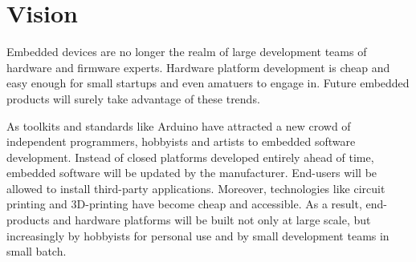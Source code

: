 \section{Vision}

Embedded devices are no longer the realm of large development teams of hardware
and firmware experts. Hardware platform development is cheap and easy enough for
small startups and even amatuers to engage in. Future embedded products will
surely take advantage of these trends. 

As toolkits and standards like Arduino have attracted a new crowd of independent
programmers, hobbyists and artists to embedded software development. Instead of
closed platforms developed entirely ahead of time, embedded software will be
updated by the manufacturer. End-users will be allowed to install third-party
applications. Moreover, technologies like circuit printing and 3D-printing have
become cheap and accessible. As a result, end-products and hardware platforms
will be built not only at large scale, but increasingly by hobbyists for
personal use and by small development teams in small batch.

